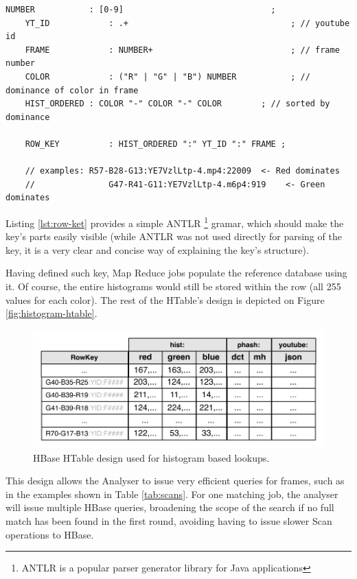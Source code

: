 \begin{lstlisting}[caption={Gramar for the Histogram RowKey. In essence, it contains an encoded color dominance value, the youtube id of the movie, and frame number.}, label={lst:row-key}]
    NUMBER           : [0-9]                              ;
    YT_ID            : .+                                 ; // youtube id
    FRAME            : NUMBER+                            ; // frame number
    COLOR            : ("R" | "G" | "B") NUMBER           ; // dominance of color in frame
    HIST_ORDERED : COLOR "-" COLOR "-" COLOR        ; // sorted by dominance

    ROW_KEY          : HIST_ORDERED ":" YT_ID ":" FRAME ;
    
    // examples: R57-B28-G13:YE7VzlLtp-4.mp4:22009  <- Red dominates
    //               G47-R41-G11:YE7VzlLtp-4.m6p4:919    <- Green dominates
\end{lstlisting}

Listing \ref{lst:row-ket} provides a simple ANTLR \footnote{ANTLR is a popular parser generator library for Java applications} gramar, which should make the key's parts easily visible (while ANTLR was not used directly for parsing of the key, it is a very clear and concise way of explaining the key's structure).

Having defined such key, Map Reduce jobs populate the reference database using it. Of course, the entire histograms would still be stored within the row (all 255 values for each color). The rest of the HTable's design is depicted on Figure \ref{fig:histogram-htable}.

\begin{figure}[ch!]
  \centering
  \includegraphics[width=\textwidth]{img/hbase-hashes-table}
  \caption{HBase HTable design used for histogram based lookups.}
  \label{fig:histogram-table}
\end{figure}

This design allows the Analyser to issue very efficient queries for frames, such as in the examples shown in Table \ref{tab:scans}. For one matching job, the analyser will issue multiple HBase queries, broadening the scope of the search if no full match has been found in the first round, avoiding having to issue slower Scan operations to HBase.

